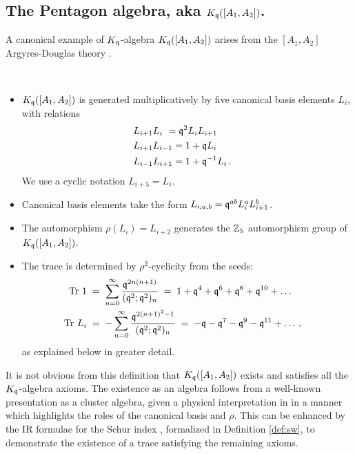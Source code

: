 \documentclass[12pt]{amsart}
\begin{document}
\subsection{The Pentagon algebra, aka $K_{\mathfrak{q}}([A_1,A_2])$.}
\label{sec:pentagon}
A canonical example of $K_{\mathfrak{q}}$-algebra $K_{\mathfrak{q}}([A_1,A_2])$ arises from the $[A_1,A_2]$ Argyres-Douglas theory \cite{Argyres:1995jj,Argyres:1995xn,Gaiotto:2010be,Cecotti:2010fi,Alim:2011ae}. 
\begin{definition} \,
\label{def:penta}
\begin{itemize}
	\item $K_{\mathfrak{q}}([A_1,A_2])$ is generated multiplicatively by five canonical basis elements $L_i$,  
	with relations 
	\begin{align}
		&L_{i+1} L_i \,\,= \mathfrak{q}^2 L_i L_{i+1} \cr
		&L_{i+1} L_{i-1} = 1+\mathfrak{q} L_i \cr
		&L_{i-1} L_{i+1} = 1+\mathfrak{q}^{-1} L_i \, .
	\end{align}
	We use a cyclic notation $L_{i+5}= L_{i}$.  
	\item Canonical basis elements take the form $L_{i;a,b} = \mathfrak{q}^{ab} L_i^a L_{i+1}^b$. 
	\item The automorphism $\rho(L_i) = L_{i+2}$ generates the $\mathbb{Z}_5$ automorphism group of $K_{\mathfrak{q}}([A_1,A_2])$.
	\item The trace is determined by $\rho^2$-cyclicity from the seeds:
	 \begin{align}
		\operatorname{Tr}\, 1 &\;=\;  \sum_{n=0}^{\infty} \frac{\mathfrak{q}^{2n(n+1)}}{(\mathfrak{q}^2;\mathfrak{q}^2)_n} \;=\; 1 + \mathfrak{q}^4 + \mathfrak{q}^6 + \mathfrak{q}^8 + \mathfrak{q}^{10} + \ldots \cr
		\operatorname{Tr}\, L_i &\;=\;  -\sum_{n=0}^{\infty} \frac{\mathfrak{q}^{2(n+1)^2-1}}{(\mathfrak{q}^2;\mathfrak{q}^2)_{n}} \;=\;-\mathfrak{q} - \mathfrak{q}^7 -\mathfrak{q}^9 - \mathfrak{q}^{11}  + \ldots \, ,
	\end{align}
	as explained below in greater detail.
\end{itemize}
\end{definition} 
\begin{remark} It is not obvious from this definition that $K_{\mathfrak{q}}([A_1,A_2])$ exists and satisfies all the $K_{\mathfrak{q}}$-algebra axioms. The existence as an algebra follows from a well-known presentation as a cluster algebra, given a physical interpretation in \cite{Gaiotto:2010be} in a manner which highlights the roles of the canonical basis and $\rho$. This can be enhanced by the IR formulae for the Schur index \cite{Cordova:2016uwk}, formalized in Definition \ref{def:sw}, to demonstrate the existence of a trace satisfying the remaining axioms. \end{remark}
\end{document}
